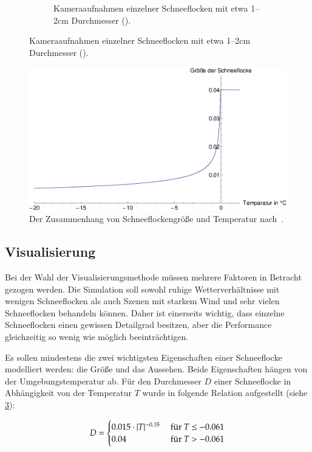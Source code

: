 \begin{figure}
\begin{subfigure}[t]{0.45\textwidth}
            \caption{Kameraaufnahmen einzelner Schneeflocken mit etwa 1--2cm Durchmesser (\cite{Hanesch1966}).}
\label{fig:implementation_real_snowflakes}
    \end{subfigure}
\end{figure}

\begin{figure}[ht]
\centering
\includegraphics[width=14cm]{images/snowflake_size_graph}
\caption{Der Zusammenhang von Schneeflockengröße und Temperatur nach~\cite{Jun00}.}
\label{fig:implementation_snowflake_size_graph}
\end{figure}

\subsection{Visualisierung}

Bei der Wahl der Visualisierungsmethode müssen mehrere Faktoren in
Betracht gezogen werden. Die Simulation soll sowohl ruhige
Wetterverhältnisse mit wenigen Schneeflocken als auch Szenen mit
starkem Wind und sehr vielen Schneeflocken behandeln können. Daher ist
einerseits wichtig, dass einzelne Schneeflocken einen gewissen
Detailgrad besitzen, aber die Performance gleichzeitig so wenig wie
möglich beeinträchtigen.

Es sollen mindestens die zwei wichtigsten Eigenschaften einer
Schneeflocke modelliert werden: die Größe und das Aussehen. Beide
Eigenschaften hängen von der Umgebungstemperatur ab. Für den Durchmesser $D$
einer Schneeflocke in Abhängigkeit von der Temperatur $T$ wurde in
\cite{Jun00} folgende Relation aufgestellt (siehe
\cref{fig:implementation_snowflake_size_graph}):

\begin{equation}
\label{eq:implementation_snowflake_diameter}
D =
\begin{cases}
0.015 \cdot |T|^{-0.35} & \textnormal{ für }T \leq -0.061 \\
0.04 & \textnormal{ für }T > -0.061
\end{cases}
\end{equation}

